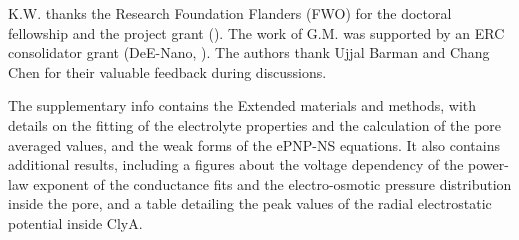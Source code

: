 \documentclass[journal=ancac3,manuscript=article,etalmode=truncate,maxauthors=0,layout=twocolumn]{achemso}
\begin{document}
\begin{acknowledgement}
K.W. thanks the Research Foundation Flanders (FWO) for the doctoral fellowship and the project grant
(). The work of G.M. was supported by an ERC consolidator grant (DeE-Nano, ).
The authors thank Ujjal Barman and Chang Chen for their valuable feedback during discussions.
\end{acknowledgement}

\begin{suppinfo}
	The supplementary info contains the Extended materials and methods, with details on the fitting of the
	electrolyte properties and the calculation of the pore averaged values, and the weak forms of the ePNP-NS
	equations. It also contains additional results, including a figures about the voltage dependency of the
	power-law exponent of the conductance fits and the electro-osmotic pressure distribution inside the pore,
	and a table detailing the peak values of the radial electrostatic potential inside ClyA.
\end{suppinfo}



%
\end{document}
